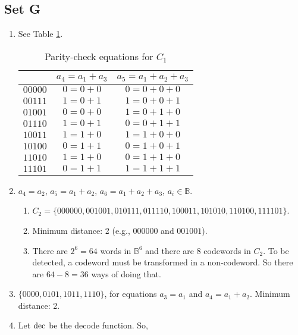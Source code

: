 \subsection{Set G}
\begin{enumerate}
    \item See Table \ref{tab:parity-c1}.
        \begin{table}[!hb]
            \centering
            \begin{tabular}{c|c|c}
                                        & $a_4 = a_1 + a_3$ & $a_5 = a_1 + a_2 + a_3$ \\ \hline
            $00000$ & $0 = 0 + 0$       & $0 = 0 + 0 + 0$         \\
            $00111$ & $1 = 0 + 1$       & $1 = 0 + 0 + 1$         \\
            $01001$ & $0 = 0 + 0$       & $1 = 0 + 1 + 0$         \\
            $01110$ & $1 = 0 + 1$       & $0 = 0 + 1 + 1$         \\
            $10011$ & $1 = 1 + 0$       & $1 = 1 + 0 + 0$         \\
            $10100$ & $0 = 1 + 1$       & $0 = 1 + 0 + 1$         \\
            $11010$ & $1 = 1 + 0$       & $0 = 1 + 1 + 0$         \\
            $11101$ & $0 = 1 + 1$       & $1 = 1 + 1 + 1$        
            \end{tabular}
            \caption{Parity-check equations for $C_1$}
            \label{tab:parity-c1}
        \end{table}
    \item $a_4 = a_2$, $a_5 = a_1 + a_2$, $a_6 = a_1 + a_2 + a_3$, $a_i \in \mathbb{B}$.
        \begin{enumerate}
            \item $C_2 = \{000000, 001001, 010111, 011110, 100011, 101010, 110100, 111101\}$.
            \item Minimum distance: 2 (e.g., $000000$ and $001001$).
            \item There are $2^6 = 64$ words in $\mathbb{B}^6$ and there are $8$ codewords in $C_2$.
            To be detected, a codeword must be transformed in a non-codeword. So there are $64 - 8 = 36$ ways of doing that.
        \end{enumerate}
    \item $\{0000, 0101, 1011, 1110\}$, for equations $a_3 = a_1$ and $a_4 = a_1 + a_2$. Minimum distance: 2.
    \item Let $\operatorname{dec}$ be the decode function. So,

\end{enumerate}
